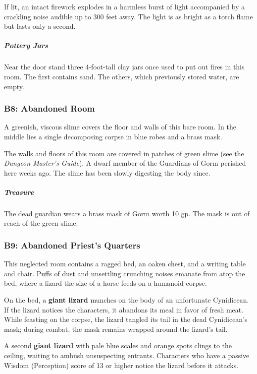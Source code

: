\documentclass[10pt,a4paper,twoside,bg=print,twocolumn,openany,nodeprecatedcode]{dndbook}
\begin{document}
If lit, an intact firework explodes in a harmless burst of light accompanied by a crackling noise audible up to 300 feet away. The light is as bright as a torch flame but lasts only a second.

\subparagraph{Pottery Jars}
Near the door stand three 4-foot-tall clay jars once used to put out fires in this room. The first contains sand. The others, which previously stored water, are empty.

\subsubsection{B8: Abandoned Room}
\begin{DndReadAloud}{}
A greenish, viscous slime covers the floor and walls of this bare room. In the middle lies a single decomposing corpse in blue robes and a brass mask.

\end{DndReadAloud}

The walls and floors of this room are covered in patches of green slime (see the \textit{Dungeon Master's Guide}). A dwarf member of the Guardians of Gorm perished here weeks ago. The slime has been slowly digesting the body since.

\subparagraph{Treasure}
The dead guardian wears a brass mask of Gorm worth 10 gp. The mask is out of reach of the green slime.

\subsubsection{B9: Abandoned Priest's Quarters}
\begin{DndReadAloud}{}
This neglected room contains a ragged bed, an oaken chest, and a writing table and chair. Puffs of dust and unsettling crunching noises emanate from atop the bed, where a lizard the size of a horse feeds on a humanoid corpse.

\end{DndReadAloud}

On the bed, a \textbf{giant lizard} munches on the body of an unfortunate Cynidicean. If the lizard notices the characters, it abandons its meal in favor of fresh meat. While feasting on the corpse, the lizard tangled its tail in the dead Cynidicean's mask; during combat, the mask remains wrapped around the lizard's tail.

A second \textbf{giant lizard} with pale blue scales and orange spots clings to the ceiling, waiting to ambush unsuspecting entrants. Characters who have a passive Wisdom (Perception) score of 13 or higher notice the lizard before it attacks.
\end{document}
